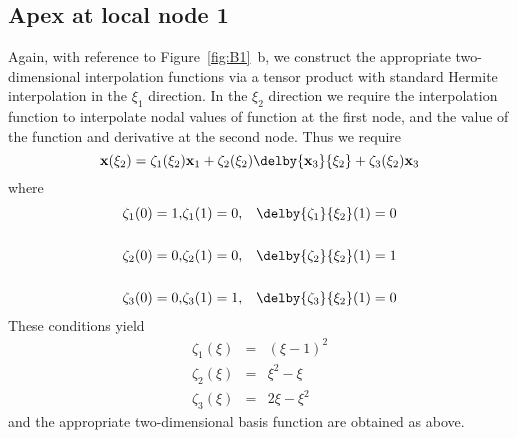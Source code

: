 \subsection{Apex at local node 1}
Again, with reference to Figure~\ref{fig:B1}~b, we construct the appropriate
two-dimensional interpolation functions via a tensor product with standard
Hermite interpolation in the $\xi_{1}$ direction.  In the $\xi_{2}$ direction
we require the interpolation function to interpolate nodal values of function
at the first node, and the value of the function and derivative at the second
node.  Thus we require
\begin{displaymath}
 {\bf x}(\xi_{2}) = \zeta_{1}(\xi_{2}){\bf x}_{1} + \zeta_{2}(\xi_{2}) 
  \delby{{\bf x}_{3}}{\xi_{2}}  + \zeta_{3}(\xi_{2}) {\bf x}_{3}
\end{displaymath}  
where   
\begin{eqnarray*}
 \zeta_{1} (0)= 1,&\zeta_{1} (1)=0,&\delby{\zeta_{1}}{\xi_{2}} (1) = 0\\  \\
 \zeta_{2} (0)= 0,&\zeta_{2} (1)=0,&\delby{\zeta_{2}}{\xi_{2}}(1) = 1\\
 \\  
 \zeta_{3} (0)= 0,&\zeta_{3} (1)=1,&\delby{\zeta_{3}}{\xi_{2}} (1) = 0
\end{eqnarray*}  
These conditions yield
\begin{eqnarray*}
 \zeta_{1} (\xi) & = & (\xi-1)^{2}\\ 
 \zeta_{2} (\xi) & = & \xi^{2} - \xi\\ 
 \zeta_{3} (\xi) & = & 2\xi-\xi^{2}
\end{eqnarray*} 
and the appropriate two-dimensional basis function are obtained as above.

